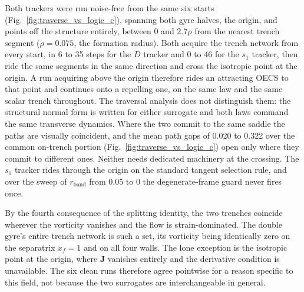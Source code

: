 \documentclass[lettersize,journal]{IEEEtran}
\begin{document}
Both trackers were run noise-free from the same six starts
(Fig.~\ref{fig:traverse_vs_logic_c}), spanning both gyre halves, the origin,
and points off the structure entirely, between $0$ and $2.7\rho$ from the
nearest trench segment ($\rho = 0.075$, the formation radius). Both acquire
the trench network from every start, in 6 to 35 steps for the $D$ tracker
and 0 to 46 for the $s_1$ tracker, then ride the same segments in the same
direction and cross the isotropic point at the origin. A run acquiring
above the origin therefore rides an attracting OECS to that point and
continues onto a repelling one, on the same law and the same scalar
trench throughout.
The traversal analysis does not distinguish them: the structural normal form
is written for either surrogate and both laws
command the same transverse dynamics. Where the two
commit to the same saddle the paths are visually coincident, and the mean
path gaps of 0.020 to 0.322 over the common on-trench portion
(Fig.~\ref{fig:traverse_vs_logic_c}) open only where they commit to
different ones. Neither needs dedicated machinery at the crossing. The
$s_1$ tracker rides through the origin on the standard tangent selection rule,
and over the sweep of $r_{\text{band}}$ from
0.05 to 0 the degenerate-frame guard never fires once.

By the fourth consequence of the splitting identity, the two trenches
coincide wherever the vorticity vanishes and the flow is
strain-dominated. The double gyre's entire
trench network is such a set, its vorticity
being identically zero on the separatrix
$x_f = 1$ and on all four walls. The lone exception is the isotropic point
at the origin, where $\mathbf{J}$ vanishes entirely and the derivative condition
is unavailable. The six clean runs therefore
agree pointwise for a reason specific to this field, not because the two
surrogates are interchangeable in general.
\end{document}
